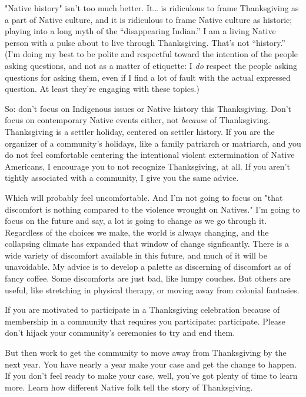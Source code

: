 \documentclass[11pt]{article}
\begin{document}
\begin{itemize}
"Native history" isn't too much better. It\ldots{} is ridiculous to frame Thanksgiving as a part of Native culture, and it is ridiculous to frame Native culture as historic; playing into a long myth of the “disappearing Indian.” I am a living Native person with a pulse about to live through Thanksgiving. That’s not “history.” (I'm doing my best to be polite and respectful toward the intention of the people asking questions, and not as a matter of etiquette: I \emph{do} respect the people asking questions for asking them, even if I find a lot of fault with the actual expressed question. At least they're engaging with these topics.)

So: don't focus on Indigenous issues or Native history this Thanksgiving. Don't focus on contemporary Native events either, not \emph{because} of Thanksgiving. Thanksgiving is a settler holiday, centered on settler history. If you are the organizer of a community's holidays, like a family patriarch or matriarch, and you do not feel comfortable centering the intentional violent extermination of Native Americans, I encourage you to not recognize Thanksgiving, at all. If you aren't tightly associated with a community, I give you the same advice.

Which will probably feel uncomfortable. And I'm not going to focus on "that discomfort is nothing compared to the violence wrought on Natives." I'm going to focus on the future and say, a lot is going to change as we go through it. Regardless of the choices we make, the world is always changing, and the collapsing climate has expanded that window of change signficantly. There is a wide variety of discomfort available in this future, and much of it will be unavoidable. My advice is to develop a palette as discerning of discomfort as of fancy coffee. Some discomforts are just bad, like lumpy couches. But others are useful, like stretching in physical therapy, or moving away from colonial fantasies.

If you are motivated to participate in a Thanksgiving celebration because of membership in a community that requires you participate: participate. Please don't hijack your community's ceremonies to try and end them.

But then work to get the community to move away from Thanksgiving by the next year. You have nearly a year make your case and get the change to happen. If you don't feel ready to make your case, well, you've got plenty of time to learn more. Learn how different Native folk tell the story of Thanksgiving.


\end{itemize}
\end{document}
